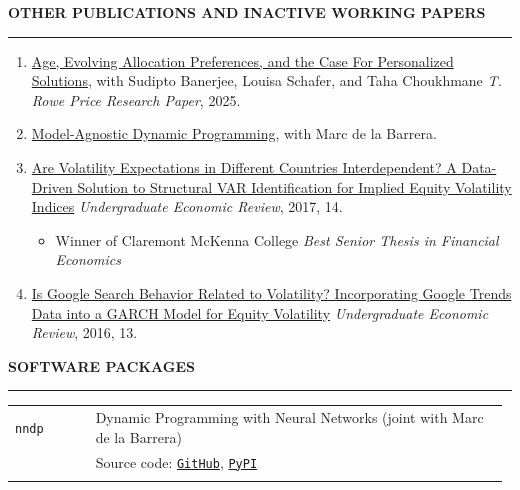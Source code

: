 \documentclass[a4paper, 10pt]{article}
\makeatletter
\newcounter{mycounter}
\newcommand{\cvsec}[1]
{
	\needspace{4\baselineskip}
	\noindent \textbf{#1}
	
	\vspace{2pt}
	
	\hrule
	
	\bigskip
}
\newcommand{\cvitem}[2]{#1 & #2 \\ & \\}
\newenvironment{cvchrono}[1]
{
	\cvsec{#1}
	\begin{longtable}{@{}>{\raggedright\arraybackslash}p{0.16\linewidth}@{\hspace{0.02\linewidth}}>{\raggedright\arraybackslash}p{0.82\linewidth}@{}}
}
{
	\end{longtable}
}
\newenvironment{cvcontinue}[1]
{
	\cvsec{#1}
	\begin{enumerate}
		\setcounter{enumi}{\themycounter}
	}
	{
	\setcounter{mycounter}{\theenumi}
	\end{enumerate}
}
\makeatother
\begin{document}
\begin{cvcontinue}{OTHER PUBLICATIONS AND INACTIVE WORKING PAPERS}
	\item \href{http://timhdesilva.github.io/files/papers/trp_white_paper.pdf}{Age, Evolving Allocation Preferences, and the Case For Personalized Solutions}, with Sudipto Banerjee, Louisa Schafer, and Taha Choukhmane \newline \emph{T. Rowe Price Research Paper}, 2025.
	\item \href{https://www.timdesilva.me/files/papers/agnostic_dp.pdf}{Model-Agnostic Dynamic Programming}, with Marc de la Barrera.
	\item \href{https://digitalcommons.iwu.edu/uer/vol14/iss1/8/}{Are Volatility Expectations in Different Countries Interdependent? A Data-Driven Solution to Structural VAR Identification for Implied Equity Volatility Indices} \newline \emph{Undergraduate Economic Review}, 2017, 14.
	\begin{itemize}
		\item Winner of Claremont McKenna College \emph{Best Senior Thesis in Financial Economics}
	\end{itemize}
	\item \href{https://digitalcommons.iwu.edu/uer/vol13/iss1/13/}{Is Google Search Behavior Related to Volatility? Incorporating Google Trends Data into a GARCH Model for Equity Volatility} \newline \emph{Undergraduate Economic Review}, 2016, 13.\\
\end{cvcontinue}

\begin{cvchrono}{SOFTWARE PACKAGES}
	\cvitem{\texttt{nndp}}{Dynamic Programming with Neural Networks (joint with Marc de la Barrera) \\
	& Source code: \href{https://github.com/marcdelabarrera/nndp}{\texttt{GitHub}}, \href{https://pypi.org/project/nndp/}{\texttt{PyPI}}
	}
\end{cvchrono}
\end{document}
